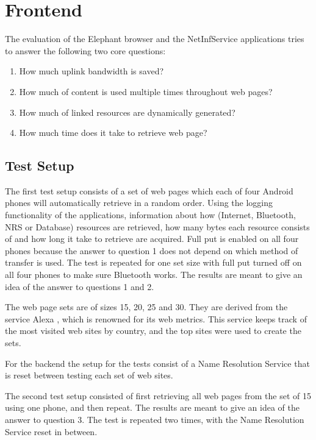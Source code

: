 \section{Frontend}

The evaluation of the Elephant browser and the NetInfService applications tries to answer the following two core questions:

\begin{enumerate}
\item How much uplink bandwidth is saved?
\item How much of content is used multiple times throughout web pages?
\item How much of linked resources are dynamically generated?
\item How much time does it take to retrieve web page?
\end{enumerate}

\subsection{Test Setup}

The first test setup consists of a set of web pages which each of four Android phones will automatically retrieve in a random order. Using the logging functionality of the applications, information about how (Internet, Bluetooth, NRS or Database) resources are retrieved, how many bytes each resource consists of and how long it take to retrieve are acquired. Full put is enabled on all four phones because the answer to question 1 does not depend on which method of transfer is used. The test is repeated for one set size with full put turned off on all four phones to make sure Bluetooth works. The results are meant to give an idea of the answer to questions 1 and 2.

The web page sets are of sizes 15, 20, 25 and 30. They are derived from the service Alexa \cite{alexa}, which is renowned for its web metrics. This service keeps track of the most visited web sites by country, and the top sites were used to create the sets.

For the backend the setup for the tests consist of a Name Resolution Service that is reset between testing each set of web sites.

The second test setup consisted of first retrieving all web pages from the set of 15 using one phone, and then repeat. The results are meant to give an idea of the answer to question 3. The test is repeated two times, with the Name Resolution Service reset in between. 

